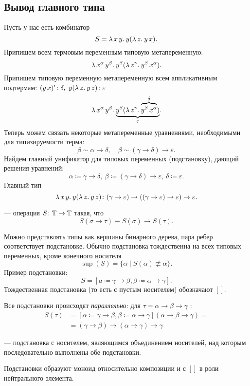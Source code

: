\documentclass[11pt,a4paper]{article}
\begin{document}
\subsection{Вывод главного типа}
Пусть у нас есть комбинатор
\[
	S = \lambda\,{x\,y}.\:{y(\lambda\,{z}.\:{y\,x})}
.\] 
Припишем всем термовым переменным типовую метапеременную:
\[
	\lambda\,{x^{\alpha}\,y^{\beta}}.\:{y^{\beta}(\lambda\,{z^{\gamma}}.\:{y^{\beta}\,x^{\alpha}})}
.\] 
Припишем типовую переменную метапеременную всем аппликативным подтермам: $ (y\,x) '\colon \delta , ~ y(\lambda\,{z}.\:{y\,z})\colon \varepsilon $
\[
	\lambda\,{x^{\alpha}\,y^{\beta}}.\:{\underbrace{y^{\beta}(\lambda\,{z^{\gamma}}.\:{\overbrace{y^{\beta}\,x^{\alpha}}^{\delta}})}_{\varepsilon}}
.\] 
Теперь можем связать некоторые метапеременные уравнениями, необходимыми для типизируемости терма:
\[
	\beta \sim \alpha \to \delta , \quad \beta \sim ( \gamma \to \delta ) \to \varepsilon 
.\] 
Найдем главный унификатор для типовых переменных (подстановку), дающий решения уравнений:
\[
	\alpha \coloneqq \gamma \to  \delta , ~ \beta \coloneqq (\gamma \to \delta ) \to  \varepsilon , ~ \delta \coloneqq  \varepsilon 
.\] 
Главный тип 
\[
	\lambda\,{x\,y}.\:{y(\lambda\,{z}.\:{y\,z})} \colon ( \gamma \to  \varepsilon ) \to (( \gamma \to  \varepsilon ) \to \varepsilon) \to  \varepsilon 
.\] 
\begin{defn}
	 --- операция $ S \colon \mathbb{T} \to  \mathbb{T}$ такая, что
	\[
		S( \sigma \to \tau ) \equiv  S( \sigma ) \to S( \tau )
	.\] 
\end{defn}
Можно представлять типы как вершины бинарного дерева, пара ребер соответствует подстановке.
Обычно подстановка тождественна на всех типовых переменных, кроме конечного носителя
\[
	\sup (S) = \{ \alpha \mid S( \alpha ) \not \equiv \alpha \}
.\] 
Пример подстановки:
\[
S = [a \coloneq \gamma \to  \beta , \beta \coloneqq   \alpha \to  \gamma ]
.\] 
Тождественная подстановка (то есть с пустым носителем) обозначают $ []$.

Все подстановки происходят \textit{параллельно}: для  $ \tau = \alpha \to \beta \to \gamma $ :
\[
\begin{aligned}
	S( \tau ) & = [ \alpha \coloneq \gamma \to \beta , \beta \coloneqq \alpha \to  \gamma ] ( \alpha \to  \beta \to \gamma ) = \\
			  &= ( \gamma \to  \beta ) \to ( \alpha \to \gamma ) \to  \gamma 
\end{aligned}
\]
\begin{defn}
	 --- подстановка с носителем,
являющимся объединением носителей, над которым
последовательно выполнены обе подстановки.
\end{defn}
Подстановки образуют моноид относительно композиции и с $ []$ в роли нейтрального элемента.
\end{document}
